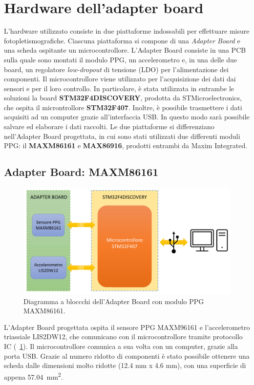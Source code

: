 \section{Hardware dell'adapter board}
L'hardware utilizzato consiste in due piattaforme indossabili per effettuare misure fotopletismografiche. Ciascuna piattaforma si compone di una \textit{Adapter Board} e una scheda ospitante un microcontrollore. L'Adapter Board consiste in una PCB sulla quale sono montati il modulo PPG, un accelerometro e, in una delle due board, un regolatore \textit{low-dropout} di tensione (LDO) per l'alimentazione dei componenti. Il microcontrollore viene utilizzato per l'acquisizione dei dati dai sensori e per il loro controllo. In particolare, è stata utilizzata in entrambe le soluzioni la board \textbf{STM32F4DISCOVERY}, prodotta da STMicroelectronics, che ospita il microntrollore \textbf{STM32F407}. Inoltre, è possibile trasmettere i dati acquisiti ad un computer grazie all'interfaccia USB. In questo modo sarà possibile salvare ed elaborare i dati raccolti.
Le due piattaforme si differenziano nell'Adapter Board progettata, in cui sono stati utilizzati due differenti moduli PPG: il \textbf{MAXM86161} e \textbf{MAX86916}, prodotti entrambi da Maxim Integrated.
\subsection{Adapter Board: MAXM86161}
\begin{figure}[t]
	\centering
	\includegraphics[width=0.6\linewidth]{ImageFiles/Hardware/DiagrammaBlocchiMAXM86161}
	\caption{Diagramma a bloccchi dell'Adapter Board con modulo PPG MAXM86161.}
	\label{fig:DiagrammaBlocchiMAXM86161}
\end{figure}
L'Adapter Board progettata ospita il sensore PPG MAXM96161 e l'accelerometro triassiale LIS2DW12, che comunicano con il microcontrollore tramite protocollo IC (\Fig~\ref{fig:DiagrammaBlocchiMAXM86161}). Il microcontrollore comunica a sua volta con un computer, grazie alla porta USB. Grazie al numero ridotto di componenti è stato possibile ottenere una scheda dalle dimensioni molto ridotte (12.4 mm x 4.6 mm), con una superficie di appena \SI{57.04}{\square\milli\meter}.

